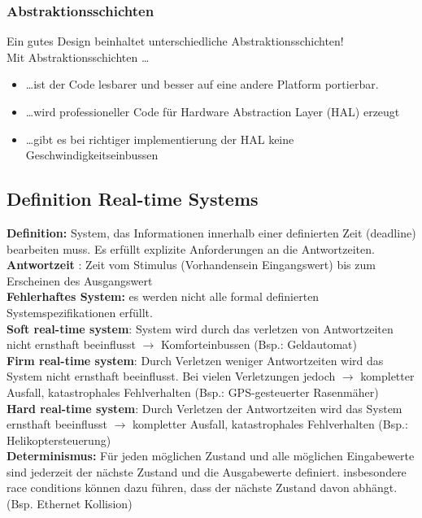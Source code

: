 \subsubsection{Abstraktionsschichten}
Ein gutes Design beinhaltet unterschiedliche Abstraktionsschichten!\\
Mit Abstraktionsschichten \ldots
\begin{itemize}
  \item \ldots ist der Code lesbarer und besser auf eine andere Platform portierbar.
  \item \ldots wird professioneller Code für Hardware Abstraction Layer (HAL) erzeugt
  \item \ldots gibt es bei richtiger implementierung der HAL keine Geschwindigkeitseinbussen
\end{itemize}
\subsection{Definition Real-time Systems}
\textbf{Definition:} System, das Informationen innerhalb einer definierten Zeit
(deadline) bearbeiten muss. Es erfüllt explizite Anforderungen an die
Antwortzeiten.\\
\textbf{Antwortzeit} : Zeit vom Stimulus (Vorhandensein
Eingangswert) bis zum Erscheinen des Ausgangswert\\
\textbf{Fehlerhaftes System:} es werden nicht alle formal definierten Systemspezifikationen erfüllt.\\
\textbf{Soft real-time system}: System wird durch das verletzen von
Antwortzeiten nicht ernsthaft beeinflusst $\rightarrow$ Komforteinbussen (Bsp.:
Geldautomat)\\
\textbf{Firm real-time system}: Durch Verletzen weniger Antwortzeiten wird das
System nicht ernsthaft beeinflusst. Bei vielen Verletzungen jedoch $\rightarrow$
kompletter Ausfall, katastrophales Fehlverhalten (Bsp.: GPS-gesteuerter
Rasenmäher)\\
\textbf{Hard real-time system}: Durch Verletzen der Antwortzeiten wird das
System ernsthaft beeinflusst $\rightarrow$ kompletter Ausfall, katastrophales
Fehlverhalten (Bsp.: Helikoptersteuerung)\\
\textbf{Determinismus:} Für jeden möglichen Zustand und alle möglichen
Eingabewerte sind jederzeit der nächste Zustand und die Ausgabewerte definiert.
insbesondere race conditions k\"onnen dazu f\"uhren, dass der nächste Zustand davon abh\"angt. (Bsp. Ethernet Kollision)

